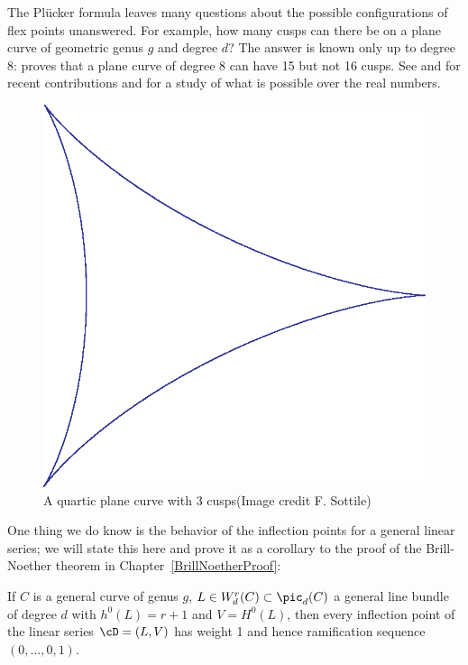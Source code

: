 The Pl\"ucker formula leaves many questions about the possible configurations of flex points unanswered. 
For example, how many cusps can there be on a plane curve of geometric genus $g$ and degree $d$? 
The answer is known only up to degree 8: \cite{Zariski1931} proves that a plane curve of degree 8 can have 15 but not 16 cusps.
See \cite{Calabri} and \cite{Kulikov} for recent contributions and \cite{Kharlamov-Sottile} for a study of what is possible
over the real numbers.
\begin{center}
\begin{figure}\label{3-cusp quartic}
 \caption{A quartic plane curve with 3 cusps(Image credit F. Sottile)}
\centerline{ \includegraphics[scale=.5]{"3_Cusps.eps"}}
\end{figure}
 \end{center}
One thing we do know is the behavior of the inflection points for a general linear series; we will state this here and prove it as a corollary to the proof of the Brill-Noether theorem in Chapter~\ref{BrillNoetherProof}:

\begin{theorem}\label{Brill Noether Plucker}
If $C$ is a general curve of genus $g$, $L \in W^r_d(C) \subset \pic_d(C)$ a general line bundle of degree $d$ with $h^0(L) = r+1$ and $V = H^0(L)$, then every inflection point of the linear series $\cD = (L, V)$ has weight 1 and hence ramification sequence $(0, \dots, 0, 1)$.
\end{theorem}

